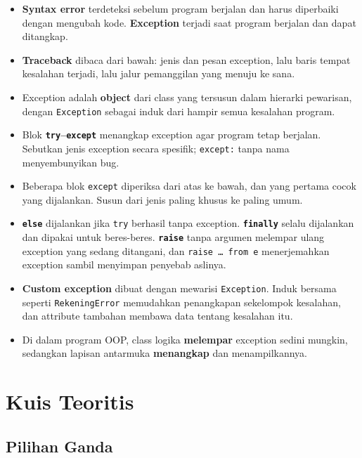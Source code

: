 \begin{itemize}
  \item \textbf{Syntax error} terdeteksi sebelum program berjalan dan harus diperbaiki dengan mengubah kode. \textbf{Exception} terjadi saat program berjalan dan dapat ditangkap.
  \item \textbf{Traceback} dibaca dari bawah: jenis dan pesan exception, lalu baris tempat kesalahan terjadi, lalu jalur pemanggilan yang menuju ke sana.
  \item Exception adalah \textbf{object} dari class yang tersusun dalam hierarki pewarisan, dengan \texttt{Exception} sebagai induk dari hampir semua kesalahan program.
  \item Blok \textbf{\texttt{try}--\texttt{except}} menangkap exception agar program tetap berjalan. Sebutkan jenis exception secara spesifik; \texttt{except:} tanpa nama menyembunyikan bug.
  \item Beberapa blok \texttt{except} diperiksa dari atas ke bawah, dan yang pertama cocok yang dijalankan. Susun dari jenis paling khusus ke paling umum.
  \item \textbf{\texttt{else}} dijalankan jika \texttt{try} berhasil tanpa exception. \textbf{\texttt{finally}} selalu dijalankan dan dipakai untuk beres-beres. \textbf{\texttt{raise}} tanpa argumen melempar ulang exception yang sedang ditangani, dan \texttt{raise \ldots\ from e} menerjemahkan exception sambil menyimpan penyebab aslinya.
  \item \textbf{Custom exception} dibuat dengan mewarisi \texttt{Exception}. Induk bersama seperti \texttt{RekeningError} memudahkan penangkapan sekelompok kesalahan, dan attribute tambahan membawa data tentang kesalahan itu.
  \item Di dalam program OOP, class logika \textbf{melempar} exception sedini mungkin, sedangkan lapisan antarmuka \textbf{menangkap} dan menampilkannya.
\end{itemize}

\section{Kuis Teoritis}

\subsection{Pilihan Ganda}

